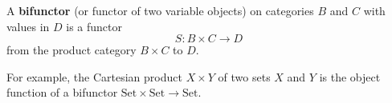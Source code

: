 A \textbf{bifunctor} (or functor of two variable objects) on categories $B$ and $C$ with values in $D$ is a functor
$$S: B \times C \to D$$
from the product category $B \times C$ to $D$.

For example, the Cartesian product $X \times Y$ of two sets $X$ and $Y$ is the object function of a bifunctor $\text{Set} \times \text{Set} \to \text{Set}$.
